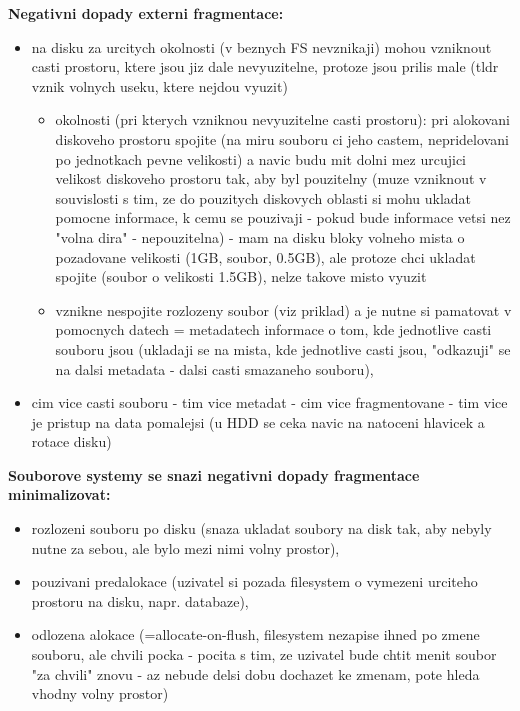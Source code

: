 \documentclass[a4paper, 11pt]{article}
\begin{document}
\noindent\textbf{Negativni dopady externi fragmentace:}
\begin{itemize}
    \item na disku za urcitych okolnosti (v beznych FS nevznikaji) mohou vzniknout casti prostoru, ktere jsou jiz dale nevyuzitelne, protoze jsou prilis male (tldr vznik volnych useku, ktere nejdou vyuzit)
    \begin{itemize}
        \item okolnosti (pri kterych vzniknou nevyuzitelne casti prostoru): pri alokovani diskoveho prostoru spojite (na miru souboru ci jeho castem, nepridelovani po jednotkach pevne velikosti) a navic budu mit dolni mez urcujici velikost diskoveho prostoru tak, aby byl pouzitelny (muze vzniknout v souvislosti s tim, ze do pouzitych diskovych oblasti si mohu ukladat pomocne informace, k cemu se pouzivaji - pokud bude informace vetsi nez "volna dira" - nepouzitelna) - mam na disku bloky volneho mista o pozadovane velikosti (1GB, soubor, 0.5GB), ale protoze chci ukladat spojite (soubor o velikosti 1.5GB), nelze takove misto vyuzit
        \item vznikne nespojite rozlozeny soubor (viz priklad) a je nutne si pamatovat v pomocnych datech = metadatech informace o tom, kde jednotlive casti souboru jsou (ukladaji se na mista, kde jednotlive casti jsou, "odkazuji" se na dalsi metadata - dalsi casti smazaneho souboru),
    \end{itemize}
    \item cim vice casti souboru - tim vice metadat - cim vice fragmentovane - tim vice je pristup na data pomalejsi (u HDD se ceka navic na natoceni hlavicek a rotace disku) \\
\end{itemize}

\noindent\textbf{Souborove systemy se snazi negativni dopady fragmentace minimalizovat:}
\begin{itemize}
    \item rozlozeni souboru po disku (snaza ukladat soubory na disk tak, aby nebyly nutne za sebou, ale bylo mezi nimi volny prostor),
    \item pouzivani predalokace (uzivatel si pozada filesystem o vymezeni urciteho prostoru na disku, napr. databaze),
    \item odlozena alokace (=allocate-on-flush, filesystem nezapise ihned po zmene souboru, ale chvili pocka - pocita s tim, ze uzivatel bude chtit menit soubor "za chvili" znovu - az nebude delsi dobu dochazet ke zmenam, pote hleda vhodny volny prostor) \\
\end{itemize}
\end{document}
